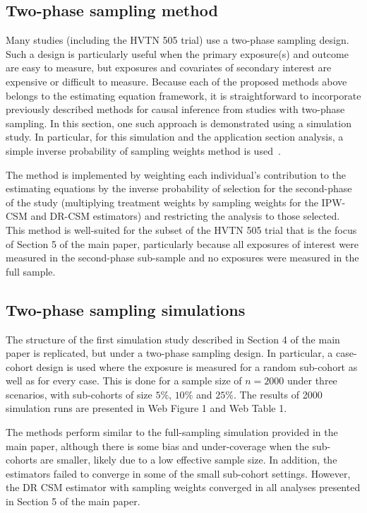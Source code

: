 \documentclass[12pt]{article}
\begin{document}
\subsection{Two-phase sampling method}

Many studies (including the HVTN 505 trial) use a two-phase sampling design. Such a design is particularly useful when the primary exposure(s) and outcome are easy to measure, but exposures and covariates of secondary interest are expensive or difficult to measure. Because each of the proposed methods above belongs to the estimating equation framework, it is straightforward to incorporate previously described methods for causal inference from studies with two-phase sampling. In this section, one such approach is demonstrated using a simulation study. In particular, for this simulation and the application section analysis, a simple inverse probability of sampling weights method is used~\citep{wang2009}.

The method is implemented by weighting each individual's contribution to the estimating equations by the inverse probability of selection for the second-phase of the study (multiplying treatment weights by sampling weights for the IPW-CSM and DR-CSM estimators) and restricting the analysis to those selected. This method is well-suited for the subset of the HVTN 505 trial that is the focus of Section 5 of the main paper, particularly because all exposures of interest were measured in the second-phase sub-sample and no exposures were measured in the full sample.

\subsection{Two-phase sampling simulations}

The structure of the first simulation study described in Section 4 of the main paper is replicated, but under a two-phase sampling design. In particular, a case-cohort design is used where the exposure is measured for a random sub-cohort as well as for every case. This is done for a sample size of $n=2000$ under three scenarios, with sub-cohorts of size $5\%$, $10\%$ and $25\%$. The results of 2000 simulation runs are presented in Web Figure 1 and Web Table 1.

The methods perform similar to the full-sampling simulation provided in the main paper, although there is some bias and under-coverage when the sub-cohorts are smaller, likely due to a low effective sample size. In addition, the estimators failed to converge in some of the small sub-cohort settings. However, the DR CSM estimator with sampling weights converged in all analyses presented in Section 5 of the main paper.
\end{document}
